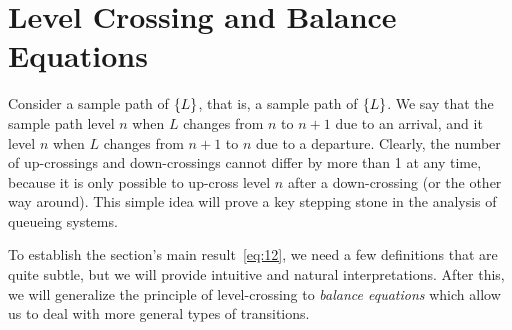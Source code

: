 


\section{Level Crossing and Balance Equations}
\label{sec:level-cross-balance}

Consider a sample path of $\{L\}$, that is, a sample path of $\{L\}$.
We say that the sample path  level $n$ when $L$ changes from $n$ to $n+1$ due to an arrival, and it  level $n$ when $L$ changes from $n+1$ to $n$ due to a departure.
Clearly, the number of up-crossings and down-crossings cannot differ by more than 1 at any time, because it is only possible to up-cross level $n$ after a down-crossing (or the other way around).
This simple idea will prove a key stepping stone in the analysis of queueing systems.

To establish the section's main result~\cref{eq:12}, we need a few definitions that are quite subtle, but we will provide intuitive and natural interpretations.
After this, we will generalize the principle of level-crossing to \emph{balance equations} which allow us to deal with more general types of transitions.

